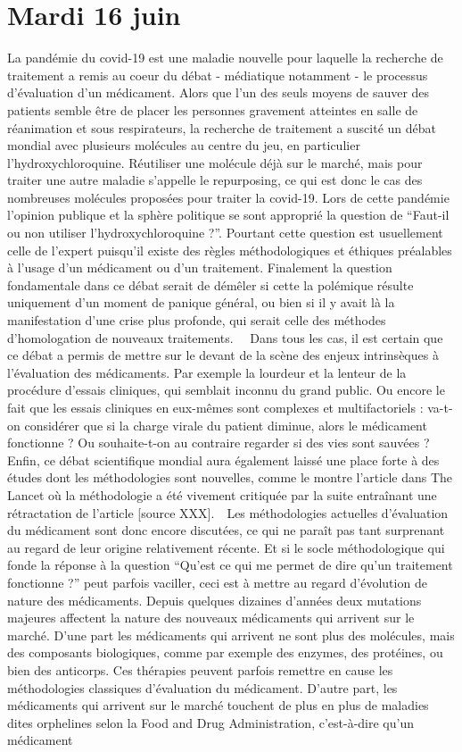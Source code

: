 \section*{Mardi 16 juin}

\begin{rightbubbles}
La pandémie du covid-19 est une maladie nouvelle pour laquelle la recherche de traitement a remis au coeur du débat - médiatique notamment - le processus d’évaluation d’un médicament. Alors que l’un des seuls moyens de sauver des patients semble être de placer les personnes gravement atteintes en salle de réanimation et sous respirateurs, la recherche de traitement a suscité un débat mondial avec plusieurs molécules au centre du jeu, en particulier l’hydroxychloroquine. Réutiliser une molécule déjà sur le marché, mais pour traiter une autre maladie s’appelle le repurposing, ce qui est donc le cas des nombreuses molécules proposées pour traiter la covid-19. Lors de cette pandémie l’opinion publique et la sphère politique se sont approprié la question de “Faut-il ou non utiliser l'hydroxychloroquine ?”. Pourtant cette question est usuellement celle de l’expert puisqu’il existe des règles méthodologiques et éthiques préalables à l’usage d’un médicament ou d’un traitement. Finalement la question fondamentale dans ce débat serait de démêler si cette la polémique résulte uniquement d’un moment de panique général, ou bien si il y avait là la manifestation d’une crise plus profonde, qui serait celle des méthodes d’homologation de nouveaux traitements. \ \ Dans tous les cas, il est certain que ce débat a permis de mettre sur le devant de la scène des enjeux intrinsèques à l’évaluation des médicaments. Par exemple la lourdeur et la lenteur de la procédure d’essais cliniques, qui semblait inconnu du grand public. Ou encore le fait que les essais cliniques en eux-mêmes sont complexes et multifactoriels : va-t-on considérer que si la charge virale du patient diminue, alors le médicament fonctionne ? Ou souhaite-t-on au contraire regarder si des vies sont sauvées ? Enfin, ce débat scientifique mondial aura également laissé une place forte à des études dont les méthodologies sont nouvelles, comme le montre l’article dans The Lancet où la méthodologie a été vivement critiquée par la suite entraînant une rétractation de l’article [source XXX].\ \ Les méthodologies actuelles d’évaluation du médicament sont donc encore discutées, ce qui ne paraît pas tant surprenant au regard de leur origine relativement récente. Et si le socle méthodologique qui fonde la réponse à la question “Qu’est ce qui me permet de dire qu’un traitement fonctionne ?” peut parfois vaciller, ceci est à mettre au regard d’évolution de nature des médicaments. Depuis quelques dizaines d’années deux mutations majeures affectent la nature des nouveaux médicaments qui arrivent sur le marché. D’une part les médicaments qui arrivent ne sont plus des molécules, mais des composants biologiques, comme par exemple des enzymes, des protéines, ou bien des anticorps. Ces thérapies peuvent parfois remettre en cause les méthodologies classiques d’évaluation du médicament. D’autre part, les médicaments qui arrivent sur le marché touchent de plus en plus de maladies dites orphelines selon la Food and Drug Administration, c’est-à-dire qu’un médicament 
\end{rightbubbles}
